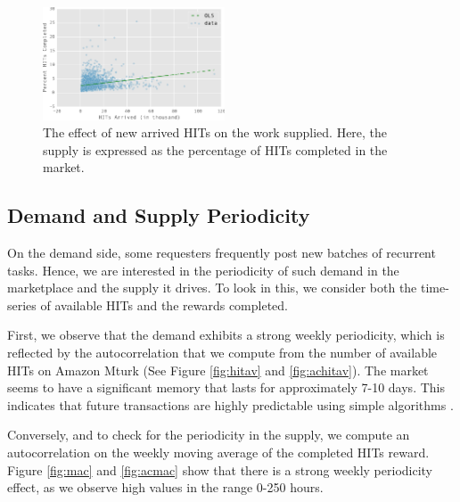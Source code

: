 \begin{figure}[t!]
	\centering
	\includegraphics[width=0.48\textwidth]{figures/percent.pdf}
	\caption{The effect of new arrived HITs on the work supplied. Here, the supply is expressed as the percentage of HITs completed in the market.}
	\label{fig:perc_hits_completed}
\end{figure}

\subsection{Demand and Supply Periodicity}
On the demand side, some requesters frequently post new batches of recurrent tasks. Hence, we are interested in the periodicity of such demand in the marketplace and the supply it drives. To look in this, we consider both the time-series of available HITs and the rewards completed. 

First, we observe that the demand exhibits a strong weekly periodicity, which is reflected by the autocorrelation that we compute from the number of available HITs on Amazon Mturk (See Figure \ref{fig:hitav} and \ref{fig:achitav}). The market seems to have a significant memory that lasts for approximately 7-10 days.
This indicates that future transactions are highly predictable using simple algorithms \cite{marketmemory}.

Conversely, and to check for the periodicity in the supply, we compute an autocorrelation on the weekly moving average of the completed HITs reward. Figure \ref{fig:mac} and \ref{fig:acmac} show that there is a strong weekly periodicity effect, as we observe high values in the range 0-250 hours.

